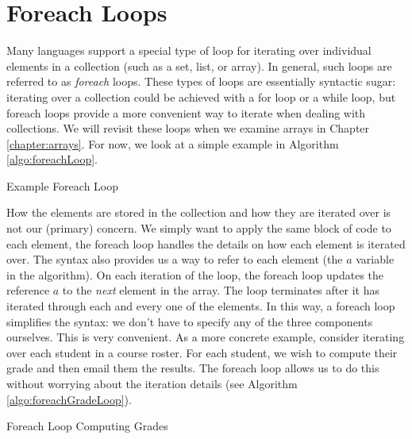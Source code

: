 \section{Foreach Loops}
\label{section:foreachLoops}

Many languages support a special type of loop for iterating over individual elements in 
a collection (such as a set, list, or array).  In general, such loops are referred to as \emph{foreach}
loops.  These types of loops are essentially \gls{syntactic sugar}: iterating over a collection
could be achieved with a for loop or a while loop, but foreach loops provide a more
convenient way to iterate when dealing with collections.  We will revisit these loops
when we examine arrays in Chapter \ref{chapter:arrays}.  For now, we look at a simple example
in Algorithm \ref{algo:foreachLoop}.

\begin{algorithm}[h]
\caption{Example Foreach Loop}
\label{algo:foreachLoop}
\end{algorithm}

How the elements are stored in the collection and how they are iterated over is not our 
(primary) concern.  We simply want to apply the same block of code to each element, 
the foreach loop handles the details on how each element is iterated over.  The syntax
also provides us a way to refer to each element (the $a$ variable in the algorithm).  On
each iteration of the loop, the foreach loop updates the reference $a$ to the \emph{next}
element in the array.  The loop terminates after it has iterated through each and every
one of the elements.  In this way, a foreach loop simplifies the syntax: we don't have to 
specify any of the three components ourselves.  This is very convenient.  As a more
concrete example, consider iterating over each student in a course roster.  For each
student, we wish to compute their grade and then email them the results.  The foreach
loop allows us to do this without worrying about the iteration details (see Algorithm 
\ref{algo:foreachGradeLoop}).

\begin{algorithm}[h]
\caption{Foreach Loop Computing Grades}
\label{algo:foreachGradeLoop}
\end{algorithm}

